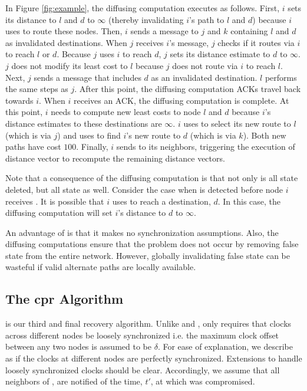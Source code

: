 
In Figure \ref{fig:example}, the diffusing computation executes as follows. First, $i$ sets its distance to $l$ and $d$ to $\infty$ (thereby invalidating $i$'s path to $l$ and $d$)
because $i$ uses \bad to route these nodes. Then, $i$ sends a message to $j$ and $k$ containing $l$ and $d$ as invalidated destinations.
When $j$ receives $i$'s message, $j$ checks if it routes via $i$ to reach $l$ or $d$. Because $j$ uses $i$ to reach $d$, $j$ sets its distance estimate to $d$ to $\infty$. 
$j$ does not modify its least cost to $l$ because $j$ does not route via $i$ to reach $l$. Next, $j$ sends a message that includes $d$ as an invalidated destination.
$l$ performs the same steps as $j$. After this point, the diffusing computation ACKs travel back towards $i$. When $i$ receives an ACK, the diffusing computation is complete. At this
point, $i$ needs to compute new least costs to node $l$ and $d$ because $i$'s distance estimates to these destinations are $\infty$. 
$i$ uses \dmatrixi to select its new route to $l$ (which is via $j$) and uses \dmatrixi to find $i$'s new route to $d$ (which is via $k$). Both new paths have cost $100$. Finally,
$i$ sends \minvi to its neighbors, triggering the execution of distance vector to recompute the remaining distance vectors.

Note that a consequence of the diffusing computation is that not only is all \badvector state deleted, but all \oldvector state as well.  
Consider the case when \bad is detected before node $i$ receives \badvectors.
It is possible that $i$ uses \oldvector to reach a destination, $d$. In this case, the diffusing computation will set $i$'s distance to $d$ to $\infty$.

An advantage of \purge is that it makes no synchronization assumptions. Also, the diffusing computations ensure that the \infinity problem does not occur by removing
false state from the entire network. However, globally invalidating false state can be wasteful if valid alternate paths are locally available. 


\subsection{The cpr Algorithm}
\label{subsec:cpr}

is our third and final recovery algorithm. 
Unlike \second and \purges, \cpr only requires that clocks across different
nodes be loosely synchronized i.e. the maximum clock offset between
any two nodes is assumed to be $\delta$. For ease of explanation, we
describe \cpr as if the clocks at different nodes are perfectly
synchronized. Extensions to handle loosely synchronized clocks should
be clear. Accordingly, we assume that all neighbors of \bads, are
notified of the time, $t'$, at which \bad was compromised.

